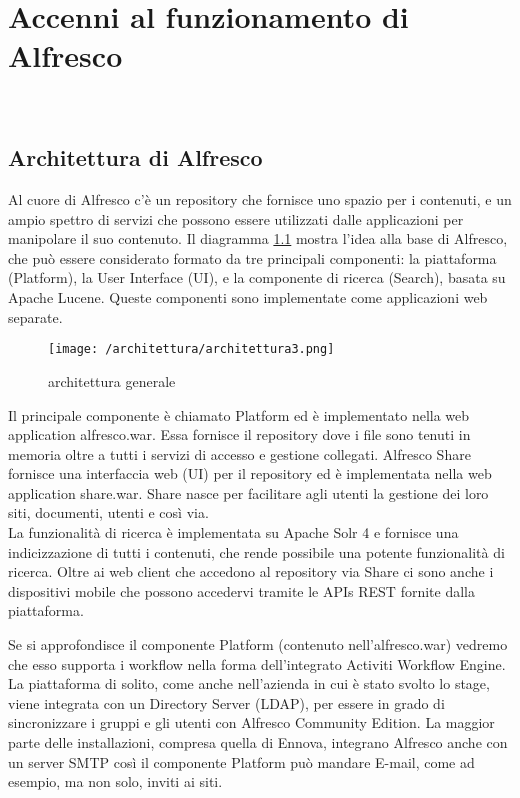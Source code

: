\chapter{Accenni al funzionamento di Alfresco}
\label{cap:architettura}

\\

\section{Architettura di Alfresco}
Al cuore di Alfresco c'è un repository che fornisce uno spazio per i contenuti, e un ampio spettro di servizi che possono essere utilizzati dalle applicazioni per manipolare il suo contenuto. Il diagramma \ref{fig:architettura-generale} mostra l'idea alla base di Alfresco, che può essere considerato formato da tre principali componenti: la piattaforma (Platform), la User Interface (UI), e la componente di ricerca (Search), basata su Apache Lucene. Queste componenti sono implementate come applicazioni web separate.
\begin{figure}[!ht]
\centering
\texttt{[image: /architettura/architettura3.png]}
\caption{architettura generale}
\label{fig:architettura-generale}
\end{figure}
Il principale componente è chiamato Platform ed è implementato nella web application alfresco.war. Essa fornisce il repository dove i file sono tenuti in memoria oltre a tutti i servizi di accesso e gestione collegati. Alfresco Share fornisce una interfaccia web (UI) per il repository ed è implementata nella web application share.war. Share nasce per facilitare agli utenti la gestione dei loro siti, documenti, utenti e così via.\\
La funzionalità di ricerca è implementata su Apache Solr 4 e fornisce una indicizzazione di tutti i contenuti, che rende possibile una potente funzionalità di ricerca. Oltre ai web client che accedono al repository via Share ci sono anche i dispositivi mobile che possono accedervi tramite le APIs REST fornite dalla piattaforma.

Se si approfondisce il componente Platform (contenuto nell'alfresco.war) vedremo che esso supporta i workflow nella forma dell'integrato \gls{Activiti Workflow Engine}. La piattaforma di solito, come anche nell'azienda in cui è stato svolto lo stage, viene integrata con un Directory Server (LDAP), per essere in grado di sincronizzare i gruppi e gli utenti con Alfresco Community Edition. La maggior parte delle installazioni, compresa quella di Ennova, integrano Alfresco anche con un server SMTP così il componente Platform può mandare E-mail, come ad esempio, ma non solo, inviti ai siti.

